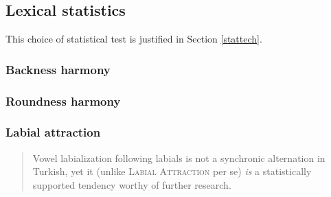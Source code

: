 \subsection{Lexical statistics}
\label{lexstats}

This choice of statistical test is justified in Section \ref{stattech}.

\subsubsection{Backness harmony}

\subsubsection{Roundness harmony}



\subsubsection{Labial attraction}

\begin{quote}
Vowel labialization following labials is not a synchronic alternation in Turkish, yet it (unlike \textsc{Labial Attraction} per se) \emph{is} a statistically supported tendency worthy of further research. \citep[][196, emphasis in original]{Inkelas2001} 
\end{quote}




